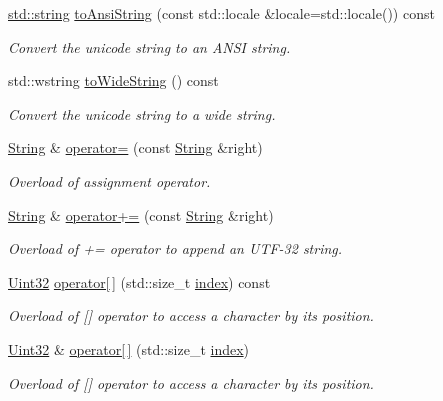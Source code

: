 \begin{DoxyCompactItemize}
\hyperlink{gl3_8h_ac83513893df92266f79a515488701770}{std\-::string} \hyperlink{classsf_1_1_string_a71d111ccfaf295b8b8be8ca4a3ceb5f4}{to\-Ansi\-String} (const std\-::locale \&locale=std\-::locale()) const 
\begin{DoxyCompactList}\small\item\em Convert the unicode string to an A\-N\-S\-I string. \end{DoxyCompactList}\item 
std\-::wstring \hyperlink{classsf_1_1_string_afd8b085ad7255543e4dc1285389d2d82}{to\-Wide\-String} () const 
\begin{DoxyCompactList}\small\item\em Convert the unicode string to a wide string. \end{DoxyCompactList}\item 
\hyperlink{classsf_1_1_string}{String} \& \hyperlink{classsf_1_1_string_a096255c066e5ef8c31952216b8ce9c42}{operator=} (const \hyperlink{classsf_1_1_string}{String} \&right)
\begin{DoxyCompactList}\small\item\em Overload of assignment operator. \end{DoxyCompactList}\item 
\hyperlink{classsf_1_1_string}{String} \& \hyperlink{classsf_1_1_string_ae6563ce2c243ae2160eea8a354199f4e}{operator+=} (const \hyperlink{classsf_1_1_string}{String} \&right)
\begin{DoxyCompactList}\small\item\em Overload of += operator to append an U\-T\-F-\/32 string. \end{DoxyCompactList}\item 
\hyperlink{namespacesf_aa746fb1ddef4410bddf198ebb27e727c}{Uint32} \hyperlink{classsf_1_1_string_a649b89a65866bf03652f7b5cb6de3bb6}{operator\mbox{[}$\,$\mbox{]}} (std\-::size\-\_\-t \hyperlink{gl3_8h_a57f14e05b1900f16a2da82ade47d0c6d}{index}) const 
\begin{DoxyCompactList}\small\item\em Overload of \mbox{[}\mbox{]} operator to access a character by its position. \end{DoxyCompactList}\item 
\hyperlink{namespacesf_aa746fb1ddef4410bddf198ebb27e727c}{Uint32} \& \hyperlink{classsf_1_1_string_abc989da7f4fb873ab29188d40772ab24}{operator\mbox{[}$\,$\mbox{]}} (std\-::size\-\_\-t \hyperlink{gl3_8h_a57f14e05b1900f16a2da82ade47d0c6d}{index})
\begin{DoxyCompactList}\small\item\em Overload of \mbox{[}\mbox{]} operator to access a character by its position. \end{DoxyCompactList}\item 

\end{DoxyCompactItemize}
